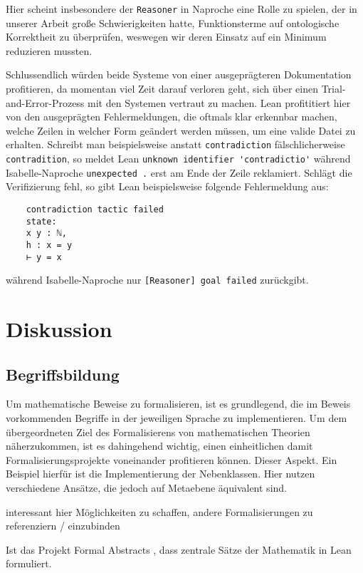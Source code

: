 \documentclass[a4paper,12pt]{scrartcl}
\begin{document}
Hier scheint insbesondere der \verb!Reasoner! in Naproche eine Rolle zu spielen, der in unserer Arbeit große Schwierigkeiten hatte, Funktionsterme auf ontologische Korrektheit zu überprüfen, weswegen wir deren Einsatz auf ein Minimum reduzieren mussten.

Schlussendlich würden beide Systeme von einer ausgeprägteren Dokumentation profitieren, da momentan viel Zeit darauf verloren geht, sich über einen Trial-and-Error-Prozess mit den Systemen vertraut zu machen.
Lean profititiert hier von den ausgeprägten Fehlermeldungen, die oftmals klar erkennbar machen, welche Zeilen in welcher Form geändert werden müssen, um eine valide Datei zu erhalten.
Schreibt man beispielsweise anstatt \verb!contradiction! fälschlicherweise \verb!contradition!, so meldet Lean \verb!unknown identifier 'contradictio'! während Isabelle-Naproche \verb!unexpected .! erst am Ende der Zeile reklamiert. Schlägt die Verifizierung fehl, so gibt Lean beispielsweise folgende Fehlermeldung aus:
\begin{lstlisting}
    contradiction tactic failed
    state:
    x y : ℕ,
    h : x = y
    ⊢ y = x
\end{lstlisting}
während Isabelle-Naproche nur \verb![Reasoner] goal failed! zurückgibt.



\newpage

\section{Diskussion}

\subsection{Begriffsbildung}

Um mathematische Beweise zu formalisieren, ist es grundlegend, die im Beweis vorkommenden Begriffe in der jeweiligen Sprache zu implementieren. Um dem übergeordneten Ziel des Formalisierens von mathematischen Theorien näherzukommen, ist es dahingehend wichtig, einen einheitlichen damit Formalisierungsprojekte voneinander profitieren können.
Dieser Aspekt.
Ein Beispiel hierfür ist die Implementierung der Nebenklassen. Hier nutzen verschiedene Ansätze, die jedoch auf Metaebene äquivalent sind.

interessant hier Möglichkeiten zu schaffen, andere Formalisierungen zu referenziern / einzubinden

Ist das Projekt Formal Abstracts \cite{bibtex.b}, dass zentrale Sätze der Mathematik in Lean formuliert.
\end{document}
